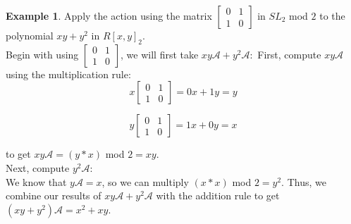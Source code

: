 \documentclass[a4paper,draft]{amsproc}
\theoremstyle{plain}
\theoremstyle{definition}
\newtheorem{exm}{Example}[section]
\theoremstyle{remark}
\numberwithin{equation}{section}
\begin{document}
\begin{exm}Apply the action using the matrix 
$\begin{bmatrix}
 0&1 \\ 
 1&0 
\end{bmatrix}$ in $SL_{2}$ mod $2$ to the polynomial $xy + y^{2}$ in $R[x,y]_{2}. $ \\ 
Begin with using $\begin{bmatrix}
 0&1 \\ 
 1&0 
\end{bmatrix}$, we will first take $xy\mathcal{A} + y^{2}\mathcal{A}:$ 
First, compute $xy\mathcal{A}$ using the multiplication rule: \\
$$x\begin{bmatrix}
 0&1 \\ 
 1&0 
\end{bmatrix} = 0x + 1y = y$$

$$y\begin{bmatrix}
 0&1 \\ 
 1&0 
\end{bmatrix} = 1x + 0y = x$$

to get  $xy\mathcal{A} = (y*x)$ mod $2 = xy$. \\

Next, compute $y^{2}\mathcal{A}$: \\
We know that $y\mathcal{A} = x$, so we can multiply $(x*x)$ mod $2 = y^{2}$. 
Thus, we combine our results of $xy\mathcal{A} + y^{2}\mathcal{A}$ with the addition rule to get $(xy + y^{2})\mathcal{A} = x^{2} + xy$. 

\end{exm}
\end{document}
